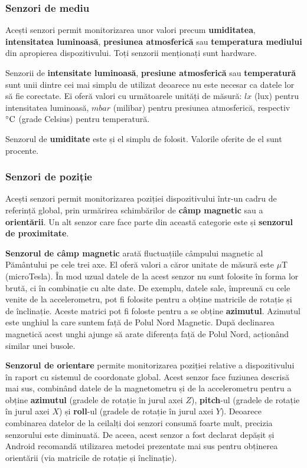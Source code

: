 \documentclass[12pt,a4paper]{article}
\begin{document}
\subsubsection{Senzori de mediu}
Acești senzori permit monitorizarea unor valori precum \textbf{umiditatea}, \textbf{intensitatea luminoasă}, \textbf{presiunea atmosferică} sau \textbf{temperatura mediului} din apropierea dispozitivului. Toți senzorii menționați sunt hardware.

Senzorii de \textbf{intensitate luminoasă}, \textbf{presiune atmosferică} sau \textbf{temperatură} sunt unii dintre cei mai simplu de utilizat deoarece nu este necesar ca datele lor să fie corectate. Ei oferă valori cu următoarele unități de măsură: $lx$ (lux) pentru intensitatea luminoasă, $mbar$ (milibar) pentru presiunea atmosferică, respectiv $\celsius$ (grade Celsius) pentru temperatură.

Senzorul de \textbf{umiditate} este și el simplu de folosit. Valorile oferite de el sunt procente.


\subsubsection{Senzori de poziție}
Acești senzori permit monitorizarea poziției dispozitivului într-un cadru de referință global, prin urmărirea schimbărilor de \textbf{câmp magnetic} sau a \textbf{orientării}. Un alt senzor care face parte din această categorie este și  \textbf{senzorul de proximitate}.

\textbf{Senzorul de câmp magnetic} arată fluctuațiile câmpului magnetic al Pământului pe cele trei axe. El oferă valori a căror unitate de măsură este $\mu$T (microTesla). În mod uzual datele de la acest senzor nu sunt folosite în forma lor brută, ci în combinație cu alte date. De exemplu, datele sale, împreună cu cele venite de la accelerometru, pot fi folosite pentru a obține matricile de rotație și de înclinație. Aceste matrici pot fi foloste pentru a se obține \textbf{azimutul}. Azimutul este unghiul la care suntem față de Polul Nord Magnetic. După declinarea magnetică acest unghi ajunge să arate diferența față de Polul Nord, acționând similar unei busole.

\textbf{Senzorul de orientare} permite monitorizarea poziției relative a dispozitivului în raport cu sistemul de coordonate global. Acest senzor face fuziunea descrisă mai sus, combinând datele de la magnetometru și de la accelerometru pentru a obține \textbf{azimutul} (gradele de rotație în jurul axei $Z$), \textbf{pitch}-ul (gradele de rotație în jurul axei $X$) și \textbf{roll}-ul (gradele de rotație în jurul axei $Y$). Deoarece combinarea datelor de la ceilalți doi senzori consumă foarte mult, precizia senzorului este diminuată. De aceea, acest senzor a fost declarat depășit și Android recomandă utilizarea metodei prezentate mai sus pentru obținerea orientării (via matricile de rotație și înclinație).
\end{document}
